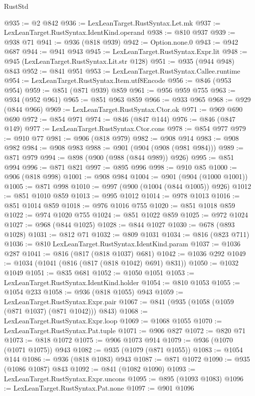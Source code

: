 \begin{lexlean}{RustStd}
\begin{coremodule}
@935 := @2 @842
@936 := LexLeanTarget.RustSyntax.Let.mk
@937 := LexLeanTarget.RustSyntax.IdentKind.operand
@938 := @810 @937
@939 := @938 @71
@941 := @936 (@818 @939)
@942 := Option.none.{0}
@943 := @942 @687
@944 := @941 @943
@945 := LexLeanTarget.RustSyntax.Expr.lit
@948 := @945 (LexLeanTarget.RustSyntax.Lit.str @128)
@951 := @935 (@944 @948) @843
@952 := @841 @951
@953 := LexLeanTarget.RustSyntax.Callee.runtime
@954 := LexLeanTarget.RustSyntax.Item.utf8Encode
@956 := @846 (@953 @954)
@959 := @851 (@871 @939) @859
@961 := @956 @959 @755
@963 := @934 (@952 @961)
@965 := @851 @963 @859
@966 := @933 @965
@968 := @929 (@844 @966)
@969 := LexLeanTarget.RustSyntax.Ctor.ok
@971 := @969 @690 @690
@972 := @854 @971
@974 := @846 (@847 @144)
@976 := @846 (@847 @149)
@977 := LexLeanTarget.RustSyntax.Ctor.cons
@978 := @854 @977
@979 := @910 @77
@981 := @906 (@818 @979)
@982 := @908 @914
@983 := @908 @982
@984 := @908 @983
@988 := @901 (@904 (@908 (@981 @984)))
@989 := @871 @979
@994 := @898 (@900 (@988 (@844 @989)) @926)
@995 := @851 @994
@996 := @871 @821
@997 := @895 @996
@998 := @910 @85
@1000 := @906 (@818 @998)
@1001 := @908 @984
@1004 := @901 (@904 (@1000 @1001))
@1005 := @871 @998
@1010 := @997 (@900 (@1004 (@844 @1005)) @926)
@1012 := @851 @1010 @859
@1013 := @995 @1012
@1014 := @978 @1013
@1016 := @851 @1014 @859
@1018 := @976 @1016 @755
@1020 := @851 @1018 @859
@1022 := @974 @1020 @755
@1024 := @851 @1022 @859
@1025 := @972 @1024
@1027 := @968 (@844 @1025)
@1028 := @844 @1027
@1030 := @678 (@893 @1028)
@1031 := @812 @71
@1032 := @809 @1031
@1034 := @816 (@823 @711)
@1036 := @810 LexLeanTarget.RustSyntax.IdentKind.param
@1037 := @1036 @287
@1041 := @816 (@817 (@818 @1037) @681)
@1042 := @1036 @292
@1049 := @1034 (@1041 (@816 (@817 (@818 @1042) @691) @831))
@1050 := @1032 @1049
@1051 := @835 @681
@1052 := @1050 @1051
@1053 := LexLeanTarget.RustSyntax.IdentKind.holder
@1054 := @810 @1053
@1055 := @1054 @233
@1058 := @936 (@818 @1055) @943
@1059 := LexLeanTarget.RustSyntax.Expr.pair
@1067 := @841 (@935 (@1058 (@1059 (@871 @1037) (@871 @1042))) @843)
@1068 := LexLeanTarget.RustSyntax.Expr.loop
@1069 := @1068 @1055
@1070 := LexLeanTarget.RustSyntax.Pat.tuple
@1071 := @906 @827
@1072 := @820 @71
@1073 := @818 @1072
@1075 := @906 @1073 @914
@1079 := @936 (@1070 (@1071 @1075)) @943
@1082 := @935 (@1079 (@871 @1055))
@1083 := @1054 @144
@1086 := @936 (@818 @1083) @943
@1087 := @871 @1072
@1090 := @935 (@1086 @1087) @843
@1092 := @841 (@1082 @1090)
@1093 := LexLeanTarget.RustSyntax.Expr.uncons
@1095 := @895 (@1093 @1083)
@1096 := LexLeanTarget.RustSyntax.Pat.none
@1097 := @901 @1096

\end{coremodule}
\end{lexlean}
